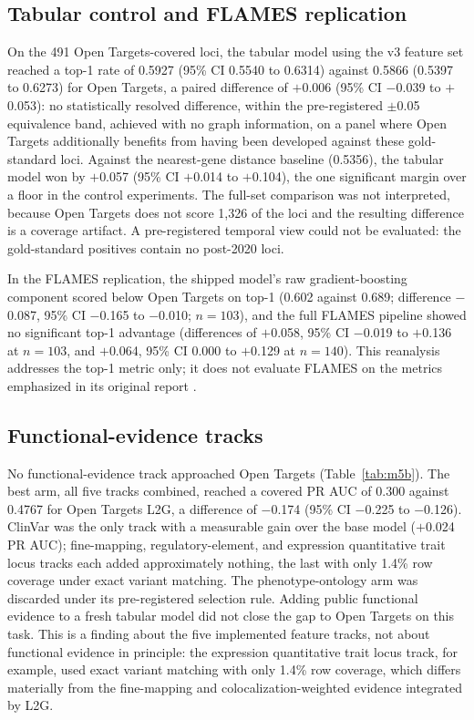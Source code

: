 \documentclass[11pt]{article}
\begin{document}
\subsection{Tabular control and FLAMES replication}

On the 491 Open Targets-covered loci, the tabular model using the v3 feature set reached a top-1 rate of 0.5927 (95\% CI 0.5540 to 0.6314) against 0.5866 (0.5397 to 0.6273) for Open Targets, a paired difference of $+$0.006 (95\% CI $-$0.039 to $+$0.053): no statistically resolved difference, within the pre-registered $\pm$0.05 equivalence band, achieved with no graph information, on a panel where Open Targets additionally benefits from having been developed against these gold-standard loci. Against the nearest-gene distance baseline (0.5356), the tabular model won by $+$0.057 (95\% CI $+$0.014 to $+$0.104), the one significant margin over a floor in the control experiments. The full-set comparison was not interpreted, because Open Targets does not score 1,326 of the loci and the resulting difference is a coverage artifact. A pre-registered temporal view could not be evaluated: the gold-standard positives contain no post-2020 loci.

In the FLAMES replication, the shipped model's raw gradient-boosting component scored below Open Targets on top-1 (0.602 against 0.689; difference $-$0.087, 95\% CI $-$0.165 to $-$0.010; $n = 103$), and the full FLAMES pipeline showed no significant top-1 advantage (differences of $+$0.058, 95\% CI $-$0.019 to $+$0.136 at $n = 103$, and $+$0.064, 95\% CI 0.000 to $+$0.129 at $n = 140$). This reanalysis addresses the top-1 metric only; it does not evaluate FLAMES on the metrics emphasized in its original report \cite{schipper2025}.

\subsection{Functional-evidence tracks}

No functional-evidence track approached Open Targets (Table~\ref{tab:m5b}). The best arm, all five tracks combined, reached a covered PR AUC of 0.300 against 0.4767 for Open Targets L2G, a difference of $-$0.174 (95\% CI $-$0.225 to $-$0.126). ClinVar was the only track with a measurable gain over the base model ($+$0.024 PR AUC); fine-mapping, regulatory-element, and expression quantitative trait locus tracks each added approximately nothing, the last with only 1.4\% row coverage under exact variant matching. The phenotype-ontology arm was discarded under its pre-registered selection rule. Adding public functional evidence to a fresh tabular model did not close the gap to Open Targets on this task. This is a finding about the five implemented feature tracks, not about functional evidence in principle: the expression quantitative trait locus track, for example, used exact variant matching with only 1.4\% row coverage, which differs materially from the fine-mapping and colocalization-weighted evidence integrated by L2G.
\end{document}
